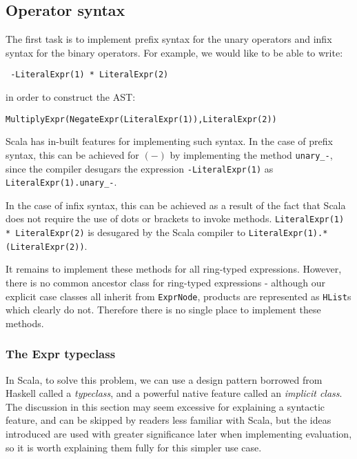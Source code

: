 \subsection{Operator syntax}
The first task is to implement prefix syntax for the unary operators and infix syntax for the binary operators. For example, we would like to be able to write:
\vs
\begin{lstlisting}
 -LiteralExpr(1) * LiteralExpr(2)
\end{lstlisting}
\vs
in order to construct the AST:
\vs
\begin{lstlisting}
MultiplyExpr(NegateExpr(LiteralExpr(1)),LiteralExpr(2))
\end{lstlisting}
\vs

Scala has in-built features for implementing such syntax. In the case of prefix syntax, this can be achieved for $(-)$ by implementing the method \lstinline{unary_-}, since the compiler desugars the expression \lstinline{-LiteralExpr(1)} as \lstinline{LiteralExpr(1).unary_-}.

In the case of infix syntax, this can be achieved as a result of the fact that Scala does not require the use of dots or brackets to invoke methods.  \lstinline{LiteralExpr(1) * LiteralExpr(2)} is desugared by the Scala compiler to \lstinline{LiteralExpr(1).*(LiteralExpr(2))}.

It remains to implement these methods for all ring-typed expressions. However, there is no common ancestor class for ring-typed expressions - although our explicit case classes all inherit from \lstinline{ExprNode}, products are represented as \lstinline{HList}s which clearly do not. Therefore there is no single place to implement these methods.

\subsubsection{The Expr typeclass} \label{exprtypeclass}
In Scala, to solve this problem, we can use a design pattern borrowed from Haskell called a \textit{typeclass}, and a powerful native feature called an \textit{implicit class}. The discussion in this section may seem excessive for explaining a syntactic feature, and can be skipped by readers less familiar with Scala, but the ideas introduced are used with greater significance later when implementing evaluation, so it is worth explaining them fully for this simpler use case.

